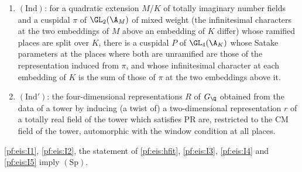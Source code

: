 \begin{definition}
\begin{enumerate}[label=(\alph*)]
\item $(\mathrm{Ind})$: for a quadratic extension $M/K$ of totally imaginary number fields and a cuspidal $\pi$ of $\GL_2(\A_M)$ of mixed weight
  (the infinitesimal characters at the two embeddings of $M$ above an embedding of $K$ differ) whose ramified places are split over $K$,
  there is a cuspidal $P$ of $\GL_4(\A_K)$ whose Satake parameters at the places where both are unramified are those of the representation
  induced from $\pi$, and whose infinitesimal character at each embedding of $K$ is the sum of those of $\pi$ at the two embeddings above it.
\item $(\mathrm{Ind}')$: the four-dimensional representations $R$ of $G_\Q$ obtained from the data of a tower by inducing (a twist of) a
  two-dimensional representation $r$ of a totally real field of the tower which satisfies $\mathrm{PR}$ are, restricted to the CM field of the
  tower, automorphic with the window condition at all places.
\end{enumerate}
\end{definition}

\begin{theorem}\label{pf:eis:main4}
\ref{pf:eis:I1}, \ref{pf:eis:I2}, the statement of \cref{pf:eis:hfit}, \ref{pf:eis:I3}, \ref{pf:eis:I4} and \ref{pf:eis:I5} imply $(\mathrm{Sp})$.
\end{theorem}

